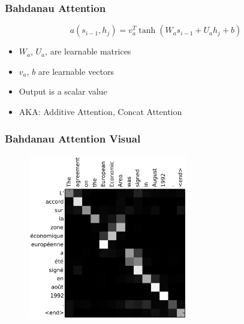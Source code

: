 \documentclass[usenames,dvipsnames]{beamer}
\begin{document}
\begin{frame}
\begin{figure}
    \end{figure}
\end{frame}

\begin{frame}
\frametitle{Bahdanau Attention}
\begin{equation*}
  a\left( s_{i-1}, h_j \right) = v_a^T \tanh \left( W_a s_{i-1} + U_a h_j + b \right)
\end{equation*}
\begin{itemize}
  \item $W_a$, $U_a$, are learnable matrices
  \item $v_a$, $b$ are learnable vectors
  \item Output is a scalar value
  \item AKA: Additive Attention, Concat Attention
\end{itemize}
\end{frame}

\begin{frame}
  \frametitle{Bahdanau Attention Visual}
  \begin{figure}
    \includegraphics[height=7.25cm]{assets/concat1}
  \end{figure}
\end{frame}
\end{document}
